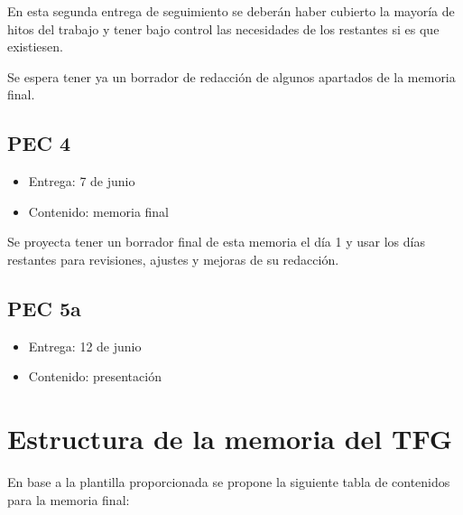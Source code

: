 En esta segunda entrega de seguimiento se deberán haber cubierto la mayoría de hitos del trabajo y tener bajo control las necesidades de los restantes si es que existiesen.

Se espera tener ya un borrador de redacción de algunos apartados de la memoria final.

\subsection{PEC 4}

\begin{itemize}
    \item Entrega: 7 de junio
    \item Contenido: memoria final
\end{itemize}

Se proyecta tener un borrador final de esta memoria el día 1 y usar los días restantes para revisiones, ajustes y mejoras de su redacción.

\subsection{PEC 5a}

\begin{itemize}
    \item Entrega: 12 de junio
    \item Contenido: presentación
\end{itemize}

\section{Estructura de la memoria del TFG}

En base a la plantilla proporcionada se propone la siguiente tabla de contenidos para la memoria final:

